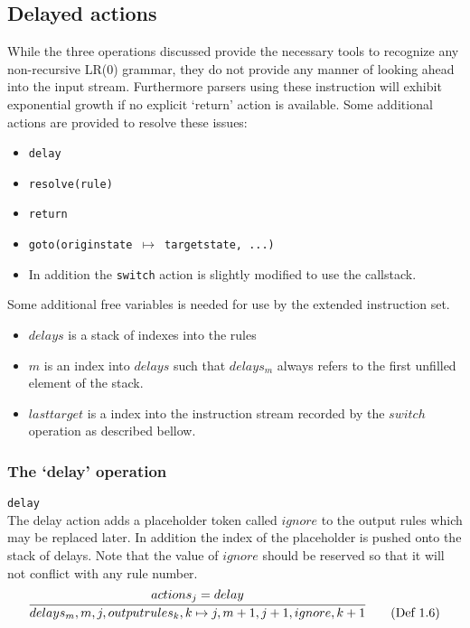 \documentclass[a4paper,11pt]{article}
\begin{document}
\subsection{Delayed actions}
While the three operations discussed provide the necessary tools to recognize any non-recursive LR(0) grammar, they do not provide any manner of looking ahead into the input stream. Furthermore parsers using these instruction will exhibit exponential growth if no explicit `return' action is available.
Some additional actions are provided to resolve these issues:
\begin{itemize}
\item \texttt{delay}
\item \texttt{resolve(rule)}
\item \texttt{return}
\item \texttt{goto(originstate $\mapsto$ targetstate, ...)}
\item In addition the \texttt{switch} action is slightly modified to use the callstack.
\end{itemize}

Some additional free variables is needed for use by the extended instruction set.

\begin{itemize}
\item $delays$ is a stack of indexes into the rules 
\item $m$ is an index into $delays$ such that $delays_m$ always refers to the first unfilled element of the stack.
\item $lasttarget$ is a index into the instruction stream recorded by the $switch$ operation as described bellow.
\end{itemize}

\subsubsection{The `delay' operation}
\texttt{delay}\\
The delay action adds a placeholder token called $ignore$ to the output rules which may be replaced later.
In addition the index of the placeholder is pushed onto the stack of delays.
Note that the value of $ignore$ should be reserved so that it will not conflict with any rule number.
\begin{equation}
\infer{delays_m, m, j, outputrules_k, k \mapsto j, m+1, j+1, ignore, k+1}{actions_j = delay} \tag{Def 1.6}
\end{equation}\\
\end{document}
